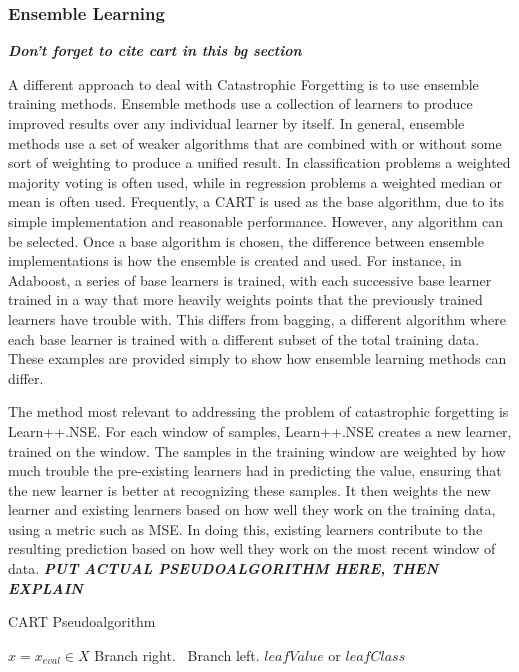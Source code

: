 	\subsubsection{Ensemble Learning}\label{bg:advanced_ensemble}
	\textbf{\textit{Don't forget to cite cart in this bg section \cite{cartIntro}}}
	\par A different approach to deal with Catastrophic Forgetting is to use ensemble training methods. Ensemble methods use a collection of learners to produce improved results over any individual learner by itself. In general, ensemble methods use a set of weaker algorithms that are combined with or without some sort of weighting to produce a unified result. In classification problems a weighted majority voting is often used, while in regression problems a weighted median or mean is often used. Frequently, a CART is used as the base algorithm, due to its simple implementation and reasonable performance. However, any algorithm can be selected. Once a base algorithm is chosen, the difference between ensemble implementations is how the ensemble is created and used. For instance, in Adaboost, a series of base learners is trained, with each successive base learner trained in a way that more heavily weights points that the previously trained learners have trouble with. This differs from bagging, a different algorithm where each base learner is trained with a different subset of the total training data. These examples are provided simply to show how ensemble learning methods can differ.
	\par The method most relevant to addressing the problem of catastrophic forgetting is Learn++.NSE. For each window of samples, Learn++.NSE creates a new learner, trained on the window. The samples in the training window are weighted by how much trouble the pre-existing learners had in predicting the value, ensuring that the new learner is better at recognizing these samples. It then weights the new learner and existing learners based on how well they work on the training data, using a metric such as MSE. In doing this, existing learners contribute to the resulting prediction based on how well they work on the most recent window of data. 
	\textbf{\textit{PUT ACTUAL PSEUDOALGORITHM HERE, THEN EXPLAIN}}
		\begin{algorithm}[ht]
		\caption{CART Pseudoalgorithm}
		\label{code:bg_cart}
		\begin{algorithmic}[1]
			\State $x = x_{eval} \in X$
			 Branch right.
			\Else \ Branch left.
			\EndIf
			\EndWhile
			\State \Return $leafValue$ or $leafClass$
			\EndProcedure
		\end{algorithmic}
	\end{algorithm}
